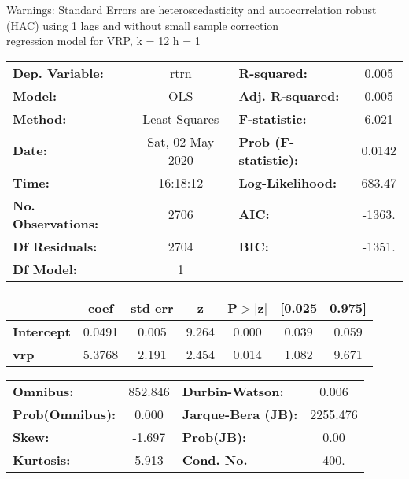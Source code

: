 Warnings: \newline
 [1] Standard Errors are heteroscedasticity and autocorrelation robust (HAC) using 1 lags and without small sample correction\\ 

regression model for VRP, k = 12 h = 1\begin{center}
\begin{tabular}{lclc}
\toprule
\textbf{Dep. Variable:}    &       rtrn       & \textbf{  R-squared:         } &     0.005   \\
\textbf{Model:}            &       OLS        & \textbf{  Adj. R-squared:    } &     0.005   \\
\textbf{Method:}           &  Least Squares   & \textbf{  F-statistic:       } &     6.021   \\
\textbf{Date:}             & Sat, 02 May 2020 & \textbf{  Prob (F-statistic):} &   0.0142    \\
\textbf{Time:}             &     16:18:12     & \textbf{  Log-Likelihood:    } &    683.47   \\
\textbf{No. Observations:} &        2706      & \textbf{  AIC:               } &    -1363.   \\
\textbf{Df Residuals:}     &        2704      & \textbf{  BIC:               } &    -1351.   \\
\textbf{Df Model:}         &           1      & \textbf{                     } &             \\
\bottomrule
\end{tabular}
\begin{tabular}{lcccccc}
                   & \textbf{coef} & \textbf{std err} & \textbf{z} & \textbf{P$> |$z$|$} & \textbf{[0.025} & \textbf{0.975]}  \\
\midrule
\textbf{Intercept} &       0.0491  &        0.005     &     9.264  &         0.000        &        0.039    &        0.059     \\
\textbf{vrp}       &       5.3768  &        2.191     &     2.454  &         0.014        &        1.082    &        9.671     \\
\bottomrule
\end{tabular}
\begin{tabular}{lclc}
\textbf{Omnibus:}       & 852.846 & \textbf{  Durbin-Watson:     } &    0.006  \\
\textbf{Prob(Omnibus):} &   0.000 & \textbf{  Jarque-Bera (JB):  } & 2255.476  \\
\textbf{Skew:}          &  -1.697 & \textbf{  Prob(JB):          } &     0.00  \\
\textbf{Kurtosis:}      &   5.913 & \textbf{  Cond. No.          } &     400.  \\
\bottomrule
\end{tabular}
\end{center}

